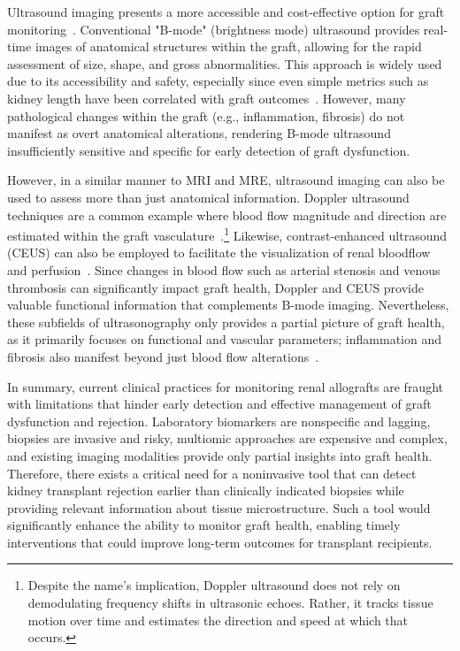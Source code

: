 Ultrasound imaging presents a more accessible and cost-effective option for graft monitoring~\cite{zhou_Current_2021}. Conventional "B-mode" (brightness mode) ultrasound provides real-time images of anatomical structures within the graft, allowing for the rapid assessment of size, shape, and gross abnormalities. This approach is widely used due to its accessibility and safety, especially since even simple metrics such as kidney length have been correlated with graft outcomes~\cite{carnahan_SolidOrgan_2024}. However, many pathological changes within the graft (e.g., inflammation, fibrosis) do not manifest as overt anatomical alterations, rendering B-mode ultrasound insufficiently sensitive and specific for early detection of graft dysfunction.

However, in a similar manner to MRI and MRE, ultrasound imaging can also be used to assess more than just anatomical information. Doppler ultrasound techniques are a common example where blood flow magnitude and direction are estimated within the graft vasculature~\cite{rifkin_Evaluation_1987,irshad_review_2008,sugi_Imaging_2019}.\footnote{
    Despite the name's implication, Doppler ultrasound does not rely on demodulating frequency shifts in ultrasonic echoes. Rather, it tracks tissue motion over time and estimates the direction and speed at which that occurs.
} Likewise, contrast-enhanced ultrasound (CEUS) can also be employed to facilitate the visualization of renal bloodflow and perfusion~\cite{zhou_Current_2021}. Since changes in blood flow such as arterial stenosis and venous thrombosis can significantly impact graft health, Doppler and CEUS provide valuable functional information that complements B-mode imaging. Nevertheless, these subfields of ultrasonography only provides a partial picture of graft health, as it primarily focuses on functional and vascular parameters; inflammation and fibrosis also manifest beyond just blood flow alterations~\cite{saritas_Kidney_2021}.


In summary, current clinical practices for monitoring renal allografts are fraught with limitations that hinder early detection and effective management of graft dysfunction and rejection. Laboratory biomarkers are nonspecific and lagging, biopsies are invasive and risky, multiomic approaches are expensive and complex, and existing imaging modalities provide only partial insights into graft health. Therefore, there exists a critical need for a noninvasive tool that can detect kidney transplant rejection earlier than clinically indicated biopsies while providing relevant information about tissue microstructure. Such a tool would significantly enhance the ability to monitor graft health, enabling timely interventions that could improve long-term outcomes for transplant recipients.
